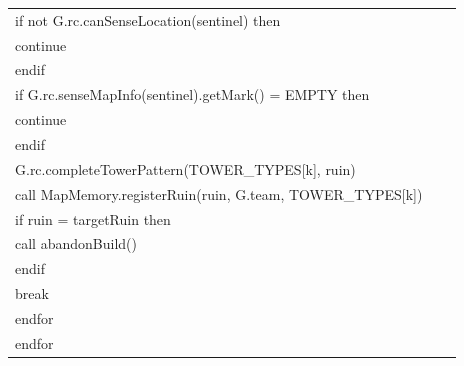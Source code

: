 \documentclass{article}
\newenvironment{pseudobox}
{
\centering
\begin{longtable}{|p{0.94\linewidth}|}
\hline
}
{
\\ \hline
\end{longtable}
\vspace{0.05cm}
}
\begin{document}
\begin{pseudobox}
\hspace*{3em} if not G.rc.canSenseLocation(sentinel) then \\
\hspace*{4em} continue \\
\hspace*{3em} endif \\

\hspace*{3em} if G.rc.senseMapInfo(sentinel).getMark() = EMPTY then \\
\hspace*{4em} continue \\
\hspace*{3em} endif \\

\hspace*{3em} G.rc.completeTowerPattern(TOWER\_TYPES[k], ruin) \\
\hspace*{3em} call MapMemory.registerRuin(ruin, G.team, TOWER\_TYPES[k]) \\

\hspace*{3em} if ruin = targetRuin then \\
\hspace*{4em} call abandonBuild() \\
\hspace*{3em} endif \\
\hspace*{3em} break \\
\hspace*{2em} endfor \\
\hspace*{1em} endfor
\end{pseudobox}
\end{document}
